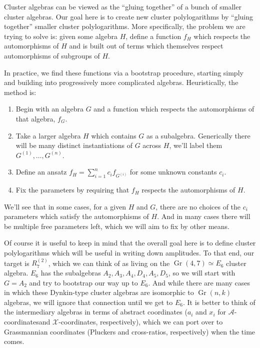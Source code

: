 \documentclass[12pt]{article}
\DeclareMathOperator{\Gr}{Gr}
\def\xcoords{$\mathcal{X}$-coordinates}
\def\acoords{$\mathcal{A}$-coordinates}
\begin{document}
\thispagestyle{fancyplain}
 
\fancyhf{}
 
\cfoot{\fancyplain{}{\thepage}}



Cluster algebras can be viewed as the ``gluing together'' of a bunch of smaller cluster algebras. Our goal here is to create new cluster polylogarithms by ``gluing together'' smaller cluster polylogarithms. More specifically, the problem we are trying to solve is: given some algebra $H$, define a function $f_H$ which respects the automorphisms of $H$ and is built out of terms which themselves respect automorphisms of subgroups of $H$.

In practice, we find these functions via a bootstrap procedure, starting simply and building into progressively more complicated algebras. Heuristically, the method is:

\begin{enumerate}
	\item Begin with an algebra $G$ and a function which respects the automorphisms of that algebra, $f_G$. 
	\item Take a larger algebra $H$ which contains $G$ as a subalgebra. Generically there will be many distinct instantiations of $G$ across $H$, we'll label them $G^{(1)},\ldots,G^{(n)}$.
	\item Define an ansatz $f_H = \sum_{i=1}^n c_i f_{G^{(i)}}$ for some unknown constants $c_i$.
	\item Fix the parameters by requiring that $f_H$ respects the automorphisms of $H$.
\end{enumerate}

We'll see that in some cases, for a given $H$ and $G$, there are no choices of the $c_i$ parameters which satisfy the automorphisms of $H$. And in many cases there will be multiple free parameters left, which we will aim to fix by other means. 

Of course it is useful to keep in mind that the overall goal here is to define cluster polylogarithms which will be useful in writing down amplitudes. To that end, our target is $R^{(2)}_7$, which we can think of as living on the $\Gr(4,7) \simeq E_6$ cluster algebra. $E_6$ has the subalgebras $A_2, A_3, A_4, D_4, A_5, D_5$, so we will start with $G = A_2$ and try to bootstrap our way up to $E_6$. And while there are many cases in which these Dynkin-type cluster algebras are isomorphic to $\Gr(n,k)$ algebras, we will ignore that connection until we get to $E_6$. It is better to think of the intermediary algebras in terms of abstract coordinates ($a_i$ and $x_i$ for \acoords and \xcoords, respectively), which we can port over to Grassmannian coordinates (Pluckers and cross-ratios, respectively) when the time comes. 
\end{document}
